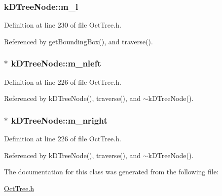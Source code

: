 \subsubsection[{m\_\-l}]{ {\bf kDTreeNode::m\_\-l}}\label{classkDTreeNode_af16fa1bae226ae88071f476e1f61f93a}


Definition at line 230 of file OctTree.h.



Referenced by getBoundingBox(), and traverse().

\subsubsection[{m\_\-nleft}]{$\ast$ {\bf kDTreeNode::m\_\-nleft}}\label{classkDTreeNode_ab0cafffecfa5a07a12a2857fd9f6a381}


Definition at line 226 of file OctTree.h.



Referenced by kDTreeNode(), traverse(), and $\sim$kDTreeNode().

\subsubsection[{m\_\-nright}]{ $\ast$ {\bf kDTreeNode::m\_\-nright}}\label{classkDTreeNode_a57b5154c42c5fee9bddfa634ed9fc33c}


Definition at line 226 of file OctTree.h.



Referenced by kDTreeNode(), traverse(), and $\sim$kDTreeNode().



The documentation for this class was generated from the following file:\begin{DoxyCompactItemize}
\item 
\hyperlink{OctTree_8h}{OctTree.h}\end{DoxyCompactItemize}
